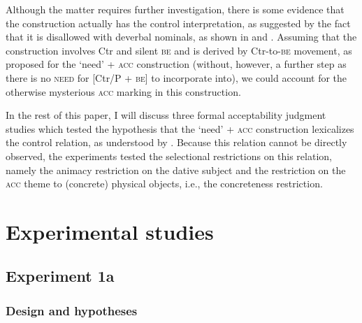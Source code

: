 \documentclass[output=paper]{langscibook}
\begin{document}
\noindent Although the matter requires further investigation, there is some evidence that the construction actually has the control interpretation, as suggested by the fact that it is disallowed with deverbal nominals, as shown in  and . Assuming that the construction involves Ctr and silent \textsc{be} and is derived by Ctr-to-\textsc{be} movement, as proposed for the `need' + \textsc{acc} construction (without, however, a further step as there is no \textsc{need} for [Ctr/P + \textsc{be}] to incorporate into), we could account for the otherwise mysterious \textsc{acc} marking in this construction.

\ea
{}
\z\z

\noindent In the rest of this paper, I will discuss three formal acceptability judgment studies which tested the hypothesis that the `need' + \textsc{acc} construction lexicalizes the control relation, as understood by \citet{Vikner.Jensen2002}. Because this relation cannot be directly observed, the experiments tested the selectional restrictions on this relation, namely the animacy restriction on the dative subject and the restriction on the \textsc{acc} theme to (concrete) physical objects, i.e., the concreteness restriction.

\section{Experimental studies\label{section-experiments}}

\subsection{Experiment 1a}

\subsubsection{Design and hypotheses}
\end{document}
